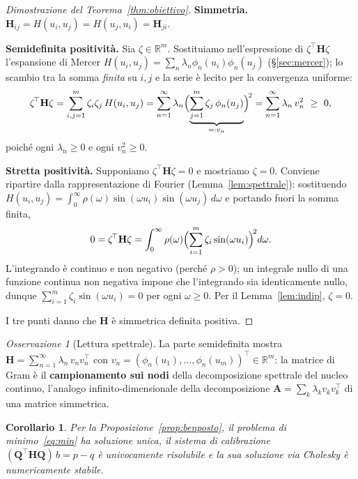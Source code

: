 \documentclass[11pt,a4paper]{article}
\theoremstyle{plain}
\newtheorem{corollario}[teorema]{Corollario}
\theoremstyle{remark}
\newtheorem*{osservazione}{Osservazione}
\newcommand{\Hmat}{\mathbf{H}}
\newcommand{\Qmat}{\mathbf{Q}}
\newcommand{\transp}{^{\!\top}}
\newcommand{\R}{\mathbb{R}}
\begin{document}
\begin{proof}[Dimostrazione del Teorema~\ref{thm:obiettivo}]
\textbf{Simmetria.} $\Hmat_{ij}=H(u_i,u_j)=H(u_j,u_i)=\Hmat_{ji}$.

\textbf{Semidefinita positivit\`a.} Sia $\zeta\in\R^m$. Sostituiamo nell'espressione di
$\zeta\transp\Hmat\zeta$ l'espansione di Mercer $H(u_i,u_j)=\sum_n\lambda_n\phi_n(u_i)\phi_n(u_j)$
(§\ref{sec:mercer}); lo scambio tra la somma \emph{finita} su $i,j$ e la serie \`e lecito per la
convergenza uniforme:
\[
  \zeta\transp\Hmat\zeta
  = \sum_{i,j=1}^m \zeta_i\zeta_j\,H(u_i,u_j)
  = \sum_{n=1}^\infty \lambda_n\Bigl(\underbrace{\sum_{j=1}^m \zeta_j\,\phi_n(u_j)}_{=:v_n}\Bigr)^{\!2}
  = \sum_{n=1}^\infty \lambda_n\,v_n^2\ \ge\ 0,
\]
poich\'e ogni $\lambda_n\ge0$ e ogni $v_n^2\ge0$.

\textbf{Stretta positivit\`a.} Supponiamo $\zeta\transp\Hmat\zeta=0$ e mostriamo $\zeta=0$.
Conviene ripartire dalla rappresentazione di Fourier (Lemma~\ref{lem:spettrale}): sostituendo
$H(u_i,u_j)=\int_0^\infty\rho(\omega)\sin(\omega u_i)\sin(\omega u_j)\,d\omega$ e portando fuori
la somma finita,
\[
  0=\zeta\transp\Hmat\zeta
   =\int_0^\infty \rho(\omega)\Bigl(\sum_{i=1}^m \zeta_i\sin(\omega u_i)\Bigr)^{\!2} d\omega .
\]
L'integrando \`e continuo e non negativo (perch\'e $\rho>0$); un integrale nullo di una funzione
continua non negativa impone che l'integrando sia identicamente nullo, dunque
$\sum_{i=1}^m \zeta_i\sin(\omega u_i)=0$ per ogni $\omega\ge0$. Per il Lemma~\ref{lem:indip},
$\zeta=0$.

I tre punti danno che $\Hmat$ \`e simmetrica definita positiva.
\end{proof}

\begin{osservazione}[Lettura spettrale]
La parte semidefinita mostra $\Hmat=\sum_{n=1}^\infty\lambda_n\,v_nv_n\transp$ con
$v_n=(\phi_n(u_1),\dots,\phi_n(u_m))\transp\in\R^m$: la matrice di Gram \`e il
\textbf{campionamento sui nodi} della decomposizione spettrale del nucleo continuo, l'analogo
infinito-dimensionale della decomposizione $\mathbf A=\sum_k\lambda_k v_kv_k\transp$ di una
matrice simmetrica.
\end{osservazione}

\begin{corollario}
Per la Proposizione~\ref{prop:benposto}, il problema di minimo~\eqref{eq:min} ha soluzione unica,
il sistema di calibrazione $(\Qmat\transp\Hmat\Qmat)\,b=p-q$ \`e univocamente risolubile e la sua
soluzione via Cholesky \`e numericamente stabile.
\end{corollario}
\end{document}
